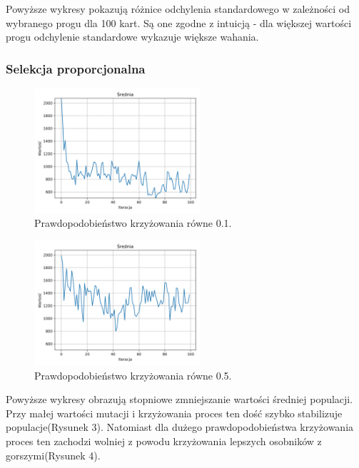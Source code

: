 \documentclass[12pt]{article}
\begin{document}
Powyższe wykresy pokazują różnice odchylenia standardowego w zależności od wybranego progu dla 100 kart. Są one zgodne z intuicją - dla większej wartości progu odchylenie standardowe wykazuje większe wahania. 

\subsubsection{Selekcja proporcjonalna}


\begin{figure}[ht]
	\centering					\includegraphics[width=0.55\textwidth]{roulette_1.png}
	\caption{Prawdopodobieństwo krzyżowania równe 0.1.}
	\label{fig1}
\end{figure}


\begin{figure}[ht]
	\centering					\includegraphics[width=0.55\textwidth]{roulette_2.png}
	\caption{Prawdopodobieństwo krzyżowania równe 0.5.}
	\label{fig1}
\end{figure}

Powyższe wykresy obrazują stopniowe zmniejszanie wartości średniej populacji. Przy małej wartości mutacji i krzyżowania proces ten dość szybko stabilizuje populacje(Rysunek 3). Natomiast dla dużego prawdopodobieństwa krzyżowania proces ten zachodzi wolniej z powodu krzyżowania lepszych osobników z gorszymi(Rysunek 4). 

\newpage
\end{document}
